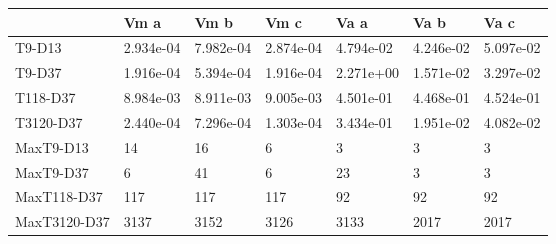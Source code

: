\begin{tabular}{lllllll}
\toprule
{} &       Vm a &       Vm b &       Vm c &       Va a &       Va b &       Va c \\
\midrule
T9-D13       &  2.934e-04 &  7.982e-04 &  2.874e-04 &  4.794e-02 &  4.246e-02 &  5.097e-02 \\
T9-D37       &  1.916e-04 &  5.394e-04 &  1.916e-04 &  2.271e+00 &  1.571e-02 &  3.297e-02 \\
T118-D37     &  8.984e-03 &  8.911e-03 &  9.005e-03 &  4.501e-01 &  4.468e-01 &  4.524e-01 \\
T3120-D37    &  2.440e-04 &  7.296e-04 &  1.303e-04 &  3.434e-01 &  1.951e-02 &  4.082e-02 \\
MaxT9-D13    &         14 &         16 &          6 &          3 &          3 &          3 \\
MaxT9-D37    &          6 &         41 &          6 &         23 &          3 &          3 \\
MaxT118-D37  &        117 &        117 &        117 &         92 &         92 &         92 \\
MaxT3120-D37 &       3137 &       3152 &       3126 &       3133 &       2017 &       2017 \\
\bottomrule
\end{tabular}

